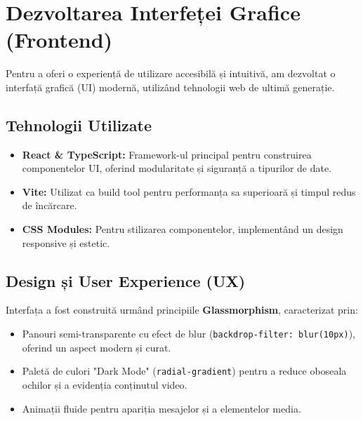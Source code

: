 \documentclass[12pt,a4paper]{report}
\begin{document}
\section{Dezvoltarea Interfeței Grafice (Frontend)}
Pentru a oferi o experiență de utilizare accesibilă și intuitivă, am dezvoltat o interfață grafică (UI) modernă, utilizând tehnologii web de ultimă generație.

\subsection{Tehnologii Utilizate}
\begin{itemize}
    \item \textbf{React \& TypeScript:} Framework-ul principal pentru construirea componentelor UI, oferind modularitate și siguranță a tipurilor de date.
    \item \textbf{Vite:} Utilizat ca build tool pentru performanța sa superioară și timpul redus de încărcare.
    \item \textbf{CSS Modules:} Pentru stilizarea componentelor, implementând un design responsive și estetic.
\end{itemize}

\subsection{Design și User Experience (UX)}
Interfața a fost construită urmând principiile \textbf{Glassmorphism}, caracterizat prin:
\begin{itemize}
    \item Panouri semi-transparente cu efect de blur (\texttt{backdrop-filter: blur(10px)}), oferind un aspect modern și curat.
    \item Paletă de culori "Dark Mode" (\texttt{radial-gradient}) pentru a reduce oboseala ochilor și a evidenția conținutul video.
    \item Animații fluide pentru apariția mesajelor și a elementelor media.
\end{itemize}
\end{document}
